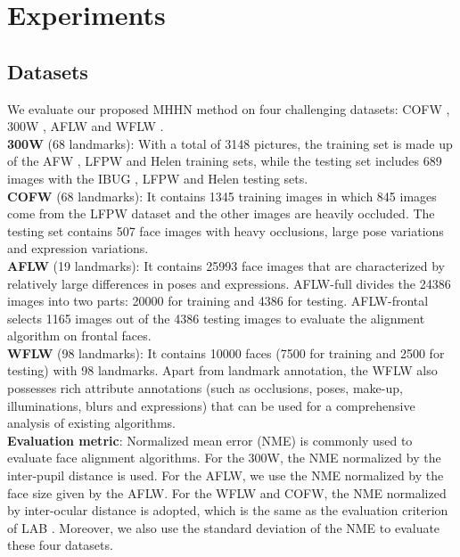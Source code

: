 \documentclass[journal]{IEEEtran}
\begin{document}
\section{Experiments}
\subsection{Datasets}
We evaluate our proposed MHHN method on four challenging datasets: COFW \cite{Burgosartizzu2013Robust}, 300W \cite{Sagonas2016300FI}, AFLW \cite{Zhu2016UnconstrainedFA} and WFLW \cite{Wu2018LookAB}.
\\\indent\textbf{300W} (68 landmarks): With a total of 3148 pictures, the training set is made up of the AFW \cite{Belhumeur2011LocalizingPO}, LFPW \cite{Zhu2012FaceDP} and Helen \cite{le2012interactive} training sets, while the testing set includes 689 images with the IBUG \cite{Sagonas2016300FI}, LFPW and Helen testing sets.
\\\indent\textbf{COFW} (68 landmarks): It contains 1345 training images in which 845 images come from the LFPW \cite{Zhu2012FaceDP} dataset and the other images are heavily occluded. The testing set contains 507 face images with heavy occlusions, large pose variations and expression variations.
\\\indent\textbf{AFLW} (19 landmarks): It contains 25993 face images that are characterized by relatively large differences in poses and expressions. AFLW-full divides the 24386 images into two parts: 20000 for training and 4386 for testing. AFLW-frontal selects 1165 images out of the 4386 testing images to evaluate the alignment algorithm on frontal faces.
\\\indent\textbf{WFLW} (98 landmarks): It contains 10000 faces (7500 for training and 2500 for testing) with 98 landmarks. Apart from landmark annotation, the WFLW also possesses rich attribute annotations (such as occlusions, poses, make-up, illuminations, blurs and expressions) that can be used for a comprehensive analysis of existing algorithms.
\\\indent\textbf{Evaluation metric}: Normalized mean error (NME) is commonly used to evaluate face alignment algorithms. For the 300W, the NME normalized by the inter-pupil distance is used. For the AFLW, we use the NME normalized by the face size given by the AFLW. For the WFLW and COFW, the NME normalized by inter-ocular distance is adopted, which is the same as the evaluation criterion of LAB \cite{Wu2018LookAB}. Moreover, we also use the standard deviation of the NME to evaluate these four datasets.
\end{document}
